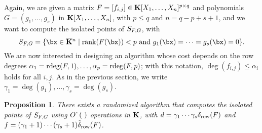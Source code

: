 \documentclass[12pt]{article}
\newtheorem{proposition}[definition]{Proposition}
\begin{document}
Again, we are given a matrix ${F} =[f_{i,j}]\in \mathbf{K}[X_1,\dots,X_n]^{p
  \times q}$ and polynomials $G=(g_1,\dots,g_s)$ in
$\mathbf{K}[X_1,\dots,X_n]$, with $p \leq q$ and $n = q-p+s+1$, and we want to
compute the isolated points of $S_{{F},G}$, with
$$S_{\mF,G} = \{\bx \in \KKbar{}^n \mid \mathrm{rank}(\mF({\bx})) < p
\text{~and~} g_1(\bx)=\cdots=g_s(\bx)=0\}.$$ We are now interested in
designing an algorithm whose cost depends on the row degrees
$\alpha_1=\mathrm{rdeg}({F},1),\dots,\alpha_p=\mathrm{rdeg}({F},p)$; with this
notation, $\deg(f_{i,j}) \leq \alpha_i$ holds for all $i,j$. As in the
previous section, we write
$\gamma_1=\deg(g_1),\dots,\gamma_s=\deg(g_s)$.

\begin{proposition}\label{prop:rowdegree}
  There exists a randomized algorithm that computes the isolated
  points of $S_{{F},G}$ using ${O}{\,\tilde{ }\,}\left (\ \right)$ operations in
  $\mathbf{K}$, with $d=\gamma_1\cdots\gamma_s \delta_{\rm row}({F})$ and
  $f=(\gamma_1+1)\cdots(\gamma_s+1) \tilde\delta_{\rm row}({F})$.
\end{proposition}




\end{document}
